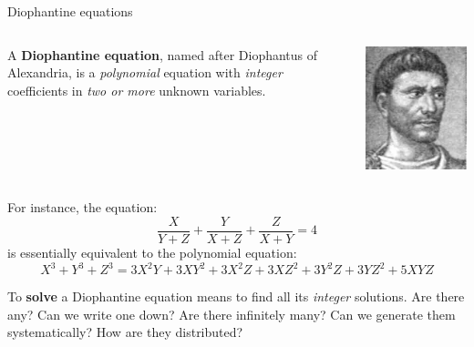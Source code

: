 \documentclass[10pt]{beamer}
\theoremstyle{definition}
\begin{document}
\begin{frame}[t]{Diophantine equations}

\begin{columns}[T]

\begin{column}{0.8\textwidth}
A \textbf{Diophantine equation}, named after Diophantus of Alexandria, is a \emph{polynomial} equation with \emph{integer} coefficients in \emph{two or more} unknown variables.
\end{column}

\begin{column}{0.1\textwidth}
\hspace{-1cm}
\includegraphics[width=1.5\textwidth]{diophantus.jpg}
\end{column}

\end{columns}

For instance, the equation:
$$ \dfrac{X}{Y + Z} + \dfrac{Y}{X + Z} + \dfrac{Z}{X + Y} = 4 $$
is essentially equivalent to the polynomial equation:
$$ X^3 + Y^3 + Z^3 = 3X^2Y + 3XY^2 + 3X^2Z + 3XZ^2 + 3Y^2Z + 3YZ^2 + 5XYZ $$

\vspace{0.5cm} To \textbf{solve} a Diophantine equation means to find all its \emph{integer} solutions. Are there any? Can we write one down? Are there infinitely many? Can we generate them systematically? How are they distributed?

\end{frame}
\end{document}
